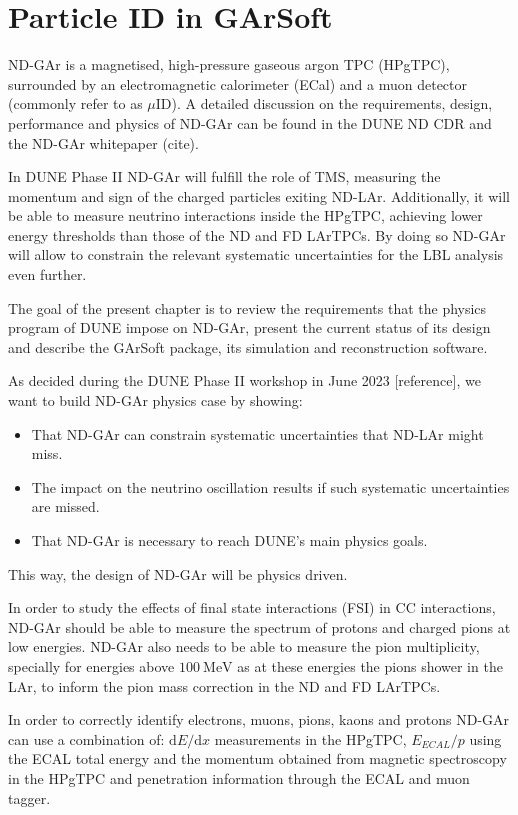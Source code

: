 \chapter{Particle ID in GArSoft}
\label{chapter:garsoft_pid}

ND-GAr is a magnetised, high-pressure gaseous argon TPC (HPgTPC), surrounded by an electromagnetic calorimeter (ECal) and a muon detector (commonly refer to as $\mu$ID). A detailed discussion on the requirements, design, performance and physics of ND-GAr can be found in the DUNE ND CDR \cite{DUNE2021NDCDR} and the ND-GAr whitepaper (cite).

In DUNE Phase II ND-GAr will fulfill the role of TMS, measuring the momentum and sign of the charged particles exiting ND-LAr. Additionally, it will be able to measure neutrino interactions inside the HPgTPC, achieving lower energy thresholds than those of the ND and FD LArTPCs. By doing so ND-GAr will allow to constrain the relevant systematic uncertainties for the LBL analysis even further.

The goal of the present chapter is to review the requirements that the physics program of DUNE impose on ND-GAr, present the current status of its design and describe the GArSoft package, its simulation and reconstruction software.

As decided during the DUNE Phase II workshop in June 2023 [reference], we want to build ND-GAr physics case by showing:
\begin{itemize}
    \item That ND-GAr can constrain systematic uncertainties that ND-LAr might miss.
    \item The impact on the neutrino oscillation results if such systematic uncertainties are missed.
    \item That ND-GAr is necessary to reach DUNE's main physics goals.
\end{itemize}

This way, the design of ND-GAr will be physics driven.

In order to study the effects of final state interactions (FSI) in CC interactions, ND-GAr should be able to measure the spectrum of protons and charged pions at low energies. ND-GAr also needs to be able to measure the pion multiplicity, specially for energies above $100~\mathrm{MeV}$ as at these energies the pions shower in the LAr, to inform the pion mass correction in the ND and FD LArTPCs.

In order to correctly identify electrons, muons, pions, kaons and protons ND-GAr can use a combination of: $\mathrm{d}E/\mathrm{d}x$ measurements in the HPgTPC, $E_{ECAL}/p$ using the ECAL total energy and the momentum obtained from magnetic spectroscopy in the HPgTPC and penetration information through the ECAL and muon tagger.

